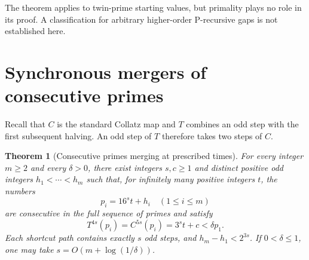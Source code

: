 \documentclass[11pt,a4paper]{article}
\newtheorem{theorem}{Theorem}[section]
\theoremstyle{definition}
\theoremstyle{remark}
\numberwithin{equation}{section}
\begin{document}
The theorem applies to twin-prime starting values, but primality plays
no role in its proof. A classification for arbitrary higher-order
P-recursive gaps is not established here.


\section{Synchronous mergers of consecutive primes}
\label{A:sec:audited-prime-merger}
Recall that $C$ is the standard Collatz map and $T$ combines an odd step
with the first subsequent halving. An odd step of $T$ therefore takes two
steps of $C$.

\begin{theorem}[Consecutive primes merging at prescribed times]
\label{A:thm:audited-bftb}
For every integer $m\ge2$ and every $\delta>0$, there exist integers
$s,c\ge1$ and distinct positive odd integers $h_1<\cdots<h_m$ such that,
for infinitely many positive integers $t$, the numbers
\[
 p_i=16^s t+h_i\quad(1\le i\le m)
\]
are consecutive in the full sequence of primes and satisfy
\[
 T^{4s}(p_i)=C^{5s}(p_i)=3^s t+c<\delta p_1.
\]
Each shortcut path contains exactly $s$ odd steps, and
$h_m-h_1<2^{3s}$. If $0<\delta\le1$, one may take
$s=O(m+\log(1/\delta))$.
\end{theorem}
\end{document}
